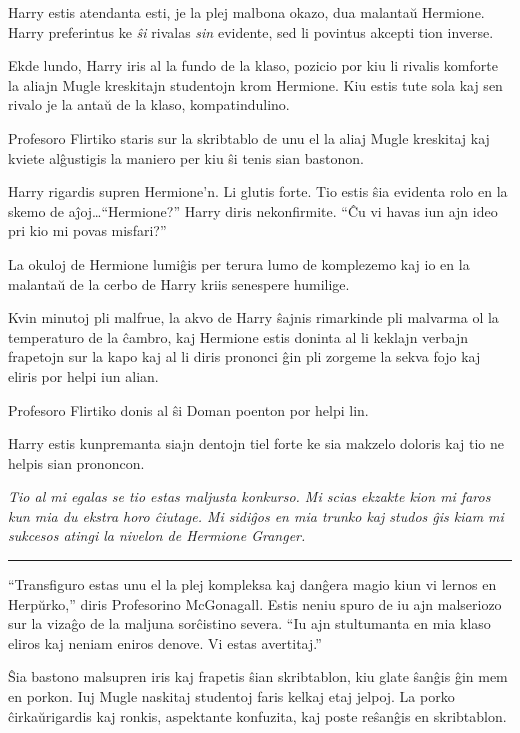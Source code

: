Harry estis atendanta esti, je la plej malbona okazo, dua malantaŭ
Hermione. Harry preferintus ke \emph{ŝi} rivalas \emph{sin} evidente,
sed li povintus akcepti tion inverse.

Ekde lundo, Harry iris al la fundo de la klaso, pozicio por kiu li
rivalis komforte la aliajn Mugle kreskitajn studentojn krom
Hermione. Kiu estis tute sola kaj sen rivalo je la antaŭ de la klaso,
kompatindulino.

Profesoro Flirtiko staris sur la skribtablo de unu el la aliaj
Mugle kreskitaj kaj kviete alĝustigis la maniero per kiu ŝi tenis sian
bastonon.

Harry rigardis supren Hermione'n. Li glutis forte. Tio estis ŝia
evidenta rolo en la skemo de aĵoj\ldots ``Hermione?'' Harry diris
nekonfirmite. ``Ĉu vi havas iun ajn ideo pri kio mi povas misfari?''

La okuloj de Hermione lumiĝis per terura lumo de komplezemo kaj io en
la malantaŭ de la cerbo de Harry kriis senespere humilige.

Kvin minutoj pli malfrue, la akvo de Harry ŝajnis rimarkinde pli
malvarma ol la temperaturo de la ĉambro, kaj Hermione estis doninta al
li keklajn verbajn frapetojn sur la kapo kaj al li diris prononci ĝin
pli zorgeme la sekva fojo kaj eliris por helpi iun alian.

Profesoro Flirtiko donis al ŝi Doman poenton por helpi lin.

Harry estis kunpremanta siajn dentojn tiel forte ke sia makzelo
doloris kaj tio ne helpis sian prononcon.

\emph{Tio al mi egalas se tio estas maljusta konkurso. Mi scias ekzakte kion
mi faros kun mia du ekstra horo ĉiutage. Mi sidiĝos en mia trunko kaj
studos ĝis kiam mi sukcesos atingi la nivelon de Hermione Granger.}

\begin{center}\rule{3in}{0.4pt}\end{center}

``Transfiguro estas unu el la plej kompleksa kaj danĝera magio kiun
vi lernos en Herpŭrko,'' diris Profesorino McGonagall. Estis neniu
spuro de iu ajn malseriozo sur la vizaĝo de la maljuna sorĉistino
severa. ``Iu ajn stultumanta en mia klaso eliros kaj neniam eniros
denove. Vi estas avertitaj.''

Ŝia bastono malsupren iris kaj frapetis ŝian skribtablon, kiu glate
ŝanĝis ĝin mem en porkon. Iuj Mugle naskitaj studentoj faris kelkaj
etaj jelpoj. La porko ĉirkaŭrigardis kaj ronkis, aspektante konfuzita,
kaj poste reŝanĝis en skribtablon.


